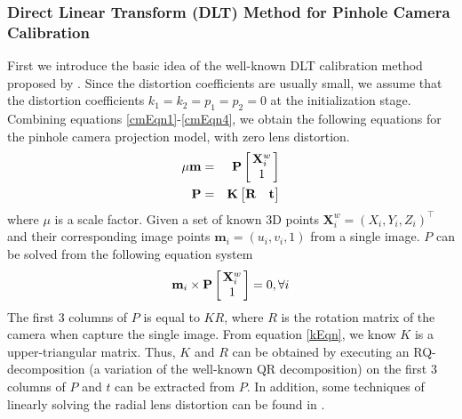 \documentclass{report}
\begin{document}
\subsubsection{Direct Linear Transform (DLT) Method for Pinhole Camera Calibration}
First we introduce the basic idea of the well-known DLT calibration method proposed by \cite{}. Since the distortion coefficients are usually small, we assume that the distortion coefficients $k_1 = k_2 = p_1 = p_2 = 0$ at the initialization stage. Combining equations \ref{cmEqn1}-\ref{cmEqn4}, we obtain the following equations for the pinhole camera projection model, with zero lens distortion. 
\begin{eqnarray}
\mu \mathbf{m} &=& \mathbf{P} 
\arraycolsep=1.5pt%
\begin{bmatrix}
	\begin{array}{c}
	\mathbf{X}^w_i \\ 1
	\end{array}
\end{bmatrix} \\
\mathbf{P} &=& \mathbf{K} 
\begin{bmatrix}
\mathbf{R} & \mathbf{t}
\end{bmatrix} 
\end{eqnarray}
where $\mu$ is a scale factor. Given a set of known 3D points $\mathbf{X}^w_i = (X_i, Y_i, Z_i)^\top$ and their corresponding image points $\mathbf{m}_i = (u_i, v_i, 1)$ from a single image. $P$ can be solved from the following equation system 
\begin{equation}
\mathbf{m}_i \times \mathbf{P} 
\arraycolsep=1.5pt%
\begin{bmatrix}
	\begin{array}{c}
	\mathbf{X}^w_i \\ 1
	\end{array}
\end{bmatrix}
 = 0, \forall i
\label{dltLS}
\end{equation}
The first 3 columns of $P$ is equal to $K R$, where $R$ is the rotation matrix of the camera when capture the single image. From equation \ref{kEqn}, we know $K$ is a upper-triangular matrix. Thus, $K$ and $R$ can be obtained by executing an RQ-decomposition (a variation of the well-known QR decomposition) on the first 3 columns of $P$ and $t$ can be extracted from $P$. In addition, some techniques of linearly solving the radial lens distortion can be found in \cite{}. 
\end{document}
